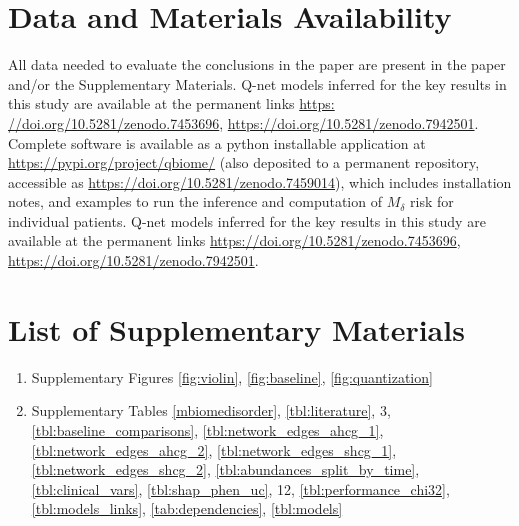 \documentclass[onecolumn,10pt]{IEEEtran}
\def\qnet{Q-net\xspace}
\def\erisk{$M_\delta$\xspace}
\begin{document}
\section*{Data and Materials Availability}
All data needed to evaluate the conclusions in the paper are present in the paper and/or the Supplementary Materials. Q-net models inferred for the key results in this study are available at the permanent links \url{https: //doi.org/10.5281/zenodo.7453696}, \url{https://doi.org/10.5281/zenodo.7942501}.
Complete software is available as a python installable application at \url{https://pypi.org/project/qbiome/} (also deposited to a permanent repository, accessible as \url{https://doi.org/10.5281/zenodo.7459014}), which includes installation notes, and examples to run the inference and computation of \erisk risk for individual patients. \qnet models inferred for the key results in this study are available at the permanent links 
\url{https://doi.org/10.5281/zenodo.7453696}, \url{https://doi.org/10.5281/zenodo.7942501}. 







\setcounter{figure}{0}
\renewcommand{\figurename}{Supplementary Fig.}                               
\setcounter{table}{0}                                     
\renewcommand{\tablename}{Supplementary Table}                          
\renewcommand{\thetable}{S\arabic{table}}
\renewcommand{\thefigure}{S\arabic{figure}}

\section*{List of Supplementary Materials}
\begin{enumerate}
\item Supplementary Figures \ref{fig:violin}, \ref{fig:baseline},
\ref{fig:quantization}

\item Supplementary Tables \ref{mbiomedisorder},
\ref{tbl:literature},
3,
\ref{tbl:baseline_comparisons},
\ref{tbl:network_edges_ahcg_1},
\ref{tbl:network_edges_ahcg_2},
\ref{tbl:network_edges_shcg_1},
\ref{tbl:network_edges_shcg_2},
\ref{tbl:abundances_split_by_time},
\ref{tbl:clinical_vars},
\ref{tbl:shap_phen_uc},
12,
\ref{tbl:performance_chi32},
\ref{tbl:models_links},
\ref{tab:dependencies}, \ref{tbl:models}

\end{enumerate}

%
\end{document}
